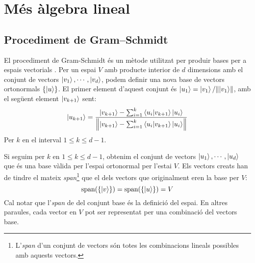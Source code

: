 \chapter{Més àlgebra lineal}

\section{Procediment de Gram–Schmidt}\label{gram}
El procediment de Gram-Schmidt és un mètode utilitzat per produir bases per a espais vectorials \cite{QCandQI:GramSchmidt}. Per un espai $V$ amb producte interior de $d$ dimensions amb el conjunt de vectors ${\ket{v_1}, \cdots, \ket{v_d}}$, podem definir una nova base de vectors ortonormals $\{\ket{u}\}$. El primer element d'aquest conjunt és $\ket{u_1} = \ket{v_1}/\norm{\ket{v_1}}$, amb el següent element $\ket{v_{k+1}}$ sent:
$$
\ket{u_{k+1}} = \frac{\ket{v_{k+1}} - \sum_{i=1}^{k} \bra{u_i}\ket{v_{k+1}}\ket{u_i}}{\norm{\ket{v_{k+1}} - \sum_{i=1}^{k} \bra{u_i}\ket{v_{k+1}}\ket{u_i}}}
$$
Per $k$ en el interval $1 \leq k \leq d-1$.

Si seguim per $k$ en $1 \leq k \leq d-1$, obtenim el conjunt de vectors ${\ket{u_1}, \cdots , \ket{u_d}}$ que és una base vàlida per l'espai ortonormal per l'estai $V$. Els vectors creats han de tindre el mateix \textit{span}\footnote{L'\textit{span} d'un conjunt de vectors són totes les combinacions lineals possibles amb aquests vectors.} que el dels vectors que originalment eren la base per $V$:
$$
\text{span}(\{\ket{v}\}) = \text{span}(\{\ket{u}\}) = V
$$
Cal notar que l'\textit{span} de del conjunt base és la definició del espai. En altres paraules, cada vector en $V$ pot ser representat per una combinació del vectors base. 


